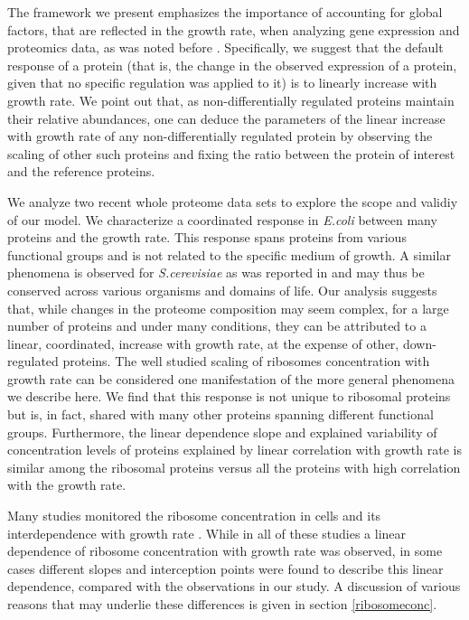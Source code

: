 \documentclass[a4paper]{article}
\begin{document}
The framework we present emphasizes the importance of accounting for global factors, that are reflected in the growth rate, when analyzing gene expression and proteomics data, as was noted before \cite{Maaloe1969,Brauer2008,Klumpp2009,Scott2010,Berthoumieux2013,Keren2013,Gerosa2013,Valgepea2013,Hui_2015,Peebo_2015,Wei_e_2015}.
Specifically, we suggest that the default response of a protein (that is, the change in the observed expression of a protein, given that no specific regulation was applied to it) is to linearly increase with growth rate.
We point out that, as non-differentially regulated proteins maintain their relative abundances, one can deduce the parameters of the linear increase with growth rate of any non-differentially regulated protein by observing the scaling of other such proteins and fixing the ratio between the protein of interest and the reference proteins.


We analyze two recent whole proteome data sets to explore the scope and validiy of our model.
We characterize a coordinated response in \emph{E.coli} between many proteins and the growth rate.
This response spans proteins from various functional groups and is not related to the specific medium of growth.
A similar phenomena is observed for \emph{S.cerevisiae} as was reported in \cite{Keren2013a} and may thus be conserved across various organisms and domains of life.
Our analysis suggests that, while changes in the proteome composition may seem complex, for a large number of proteins and under many conditions, they can be attributed to a linear, coordinated, increase with growth rate, at the expense of other, down-regulated proteins.
The well studied scaling of ribosomes concentration with growth rate can be considered one manifestation of the more general phenomena we describe here.
We find that this response is not unique to ribosomal proteins but is, in fact, shared with many other proteins spanning different functional groups.
Furthermore, the linear dependence slope and explained variability of concentration levels of proteins explained by linear correlation with growth rate is similar among the ribosomal proteins versus all the proteins with high correlation with the growth rate.

Many studies monitored the ribosome concentration in cells and its interdependence with growth rate \cite{Schaechter1958,Bremer1987,Zaslaver2009,Scott2010,Valgepea2013,Hui_2015}.
While in all of these studies a linear dependence of ribosome concentration with growth rate was observed, in some cases different slopes and interception points were found to describe this linear dependence, compared with the observations in our study.
A discussion of various reasons that may underlie these differences is given in section \ref{ribosomeconc}.
\end{document}
